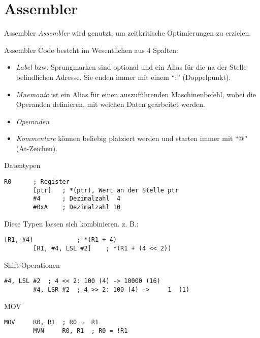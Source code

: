 \section{Assembler}

\begin{defi}{Assembler}
    \emph{Assembler} wird genutzt, um zeitkritische Optimierungen zu erzielen.

    Assembler Code besteht im Wesentlichen aus 4 Spalten:
    \begin{itemize}
        \item \emph{Label} bzw. Sprungmarken sind optional und ein Alias für die na der Stelle befindlichen Adresse.
              Sie enden immer mit einem \enquote{:}  (Doppelpunkt).
        \item \emph{Mnemonic} ist ein Alias für einen auszuführenden Maschinenbefehl, wobei die Operanden definieren, mit welchen Daten gearbeitet werden.
        \item \emph{Operanden}
        \item \emph{Kommentare} können beliebig platziert werden und starten immer mit \enquote{@} (At-Zeichen).
    \end{itemize}
\end{defi}

\begin{defi}{Datentypen}
    \begin{lstlisting}[language={[x86masm]Assembler}]
        R0      ; Register
        [ptr]   ; *(ptr), Wert an der Stelle ptr
        #4      ; Dezimalzahl  4
        #0xA    ; Dezimalzahl 10
    \end{lstlisting}

    Diese Typen lassen sich kombinieren.
    z. B.:
    \begin{lstlisting}[language={[x86masm]Assembler}]
        [R1, #4]            ; *(R1 + 4)
        [R1, #4, LSL #2]    ; *(R1 + (4 << 2))
    \end{lstlisting}
\end{defi}

\begin{defi}{Shift-Operationen}
    \begin{lstlisting}[language={[x86masm]Assembler}]
        #4, LSL #2  ; 4 << 2: 100 (4) -> 10000 (16)
        #4, LSR #2  ; 4 >> 2: 100 (4) ->     1  (1)
    \end{lstlisting}
\end{defi}

\begin{defi}{MOV}
    \begin{lstlisting}[language={[x86masm]Assembler}]
        MOV     R0, R1  ; R0 =  R1
        MVN     R0, R1  ; R0 = !R1
    \end{lstlisting}
\end{defi}

